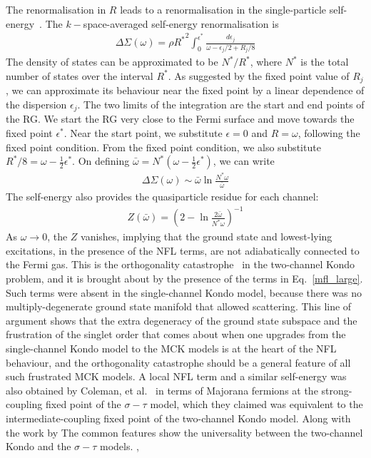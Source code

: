 \documentclass[reprint,prb,superscriptaddress]{revtex4-2}
\begin{document}
The renormalisation in \(R\) leads to a renormalisation in the single-particle self-energy~\cite{anirbanmott1}. The \(k-\)space-averaged self-energy renormalisation is
\begin{equation}\begin{aligned}
	\Delta \Sigma(\omega) = \rho {R^*}^2\int_0^{\epsilon^*} \frac{d\epsilon_j}{\omega - \epsilon_j/2 + R_j/8}
\end{aligned}\end{equation}
The density of states can be approximated to be \(N^*/R^*\), where \(N^*\) is the total number of states over the interval \(R^*\). As suggested by the fixed point value of \(R_j\), we can approximate its behaviour near the fixed point by a linear dependence of the dispersion \(\epsilon_j\). The two limits of the integration are the start and end points of the RG. We start the RG very close to the Fermi surface and move towards the fixed point \(\epsilon^*\). Near the start point, we substitute \(\epsilon = 0\) and \(R = \omega\), following the fixed point condition. From the fixed point condition, we also substitute \(R^*/8 = \omega - \frac{1}{2}\epsilon^*\). On defining \(\bar \omega = N^* \left(\omega - \frac{1}{2}\epsilon^*\right)\), we can write
\begin{equation}\begin{aligned}
	\label{self_energy}
	\Delta \Sigma(\omega) \sim  \bar \omega \ln \frac{N^* \omega}{\bar \omega}
\end{aligned}\end{equation}
The self-energy also provides the quasiparticle residue for each channel\cite{anirbanmott1}:
\begin{equation}\begin{aligned}
	Z(\bar\omega) = \left(2 - \ln \frac{2\bar\omega}{N^* \omega}\right) ^{-1}
\end{aligned}\end{equation}
As \(\omega \to 0\), the \(Z\) vanishes, implying that the ground state and lowest-lying excitations, in the presence of the NFL terms, are not adiabatically connected to the Fermi gas. This is the orthogonality catastrophe~\cite{varma2002singular,anderson_infraredcat,yamada_catastrophe,yamada1979orthogonality} in the two-channel Kondo problem, and it is brought about by the presence of the terms in Eq.~\ref{mfl_large}. Such terms were absent in the single-channel Kondo model, because there was no multiply-degenerate ground state manifold that allowed scattering. This line of argument shows that the extra degeneracy of the ground state subspace and the frustration of the singlet order that comes about when one upgrades from the single-channel Kondo model to the MCK models is at the heart of the NFL behaviour, and the orthogonality catastrophe should be a general feature of all such frustrated MCK models. A local NFL term and a similar self-energy was also obtained by Coleman, et al.~\cite{Coleman_tsvelik} in terms of Majorana fermions at the strong-coupling fixed point of the \(\sigma-\tau\) model, which they claimed was equivalent to the intermediate-coupling fixed point of the two-channel Kondo model. Along with the work by The common features show the universality between the two-channel Kondo and the \(\sigma-\tau\) models. 
,
\end{document}
